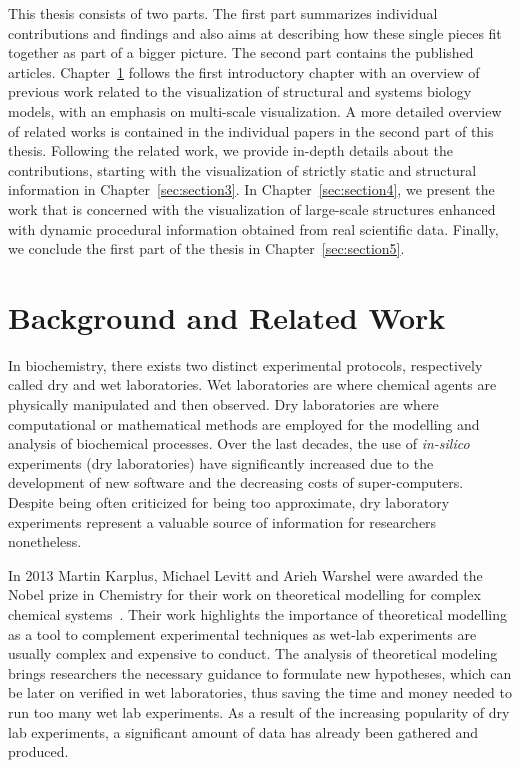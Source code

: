 This thesis consists of two parts.
The first part summarizes individual contributions and findings and also aims at describing how these single pieces fit together as part of a bigger picture.
The second part contains the published articles.
Chapter~\ref{sec:section2} follows the first introductory chapter with an overview of previous work related to the visualization of structural and systems biology models, with an emphasis on multi-scale visualization. 
A more detailed overview of related works is contained in the individual papers in the second part of this thesis. 
Following the related work, we provide in-depth details about the contributions, starting with the visualization of strictly static and structural information in Chapter~\ref{sec:section3}.
In Chapter~\ref{sec:section4}, we present the work that is concerned with the visualization of large-scale structures enhanced with dynamic procedural information obtained from real scientific data. 
Finally, we conclude the first part of the thesis in Chapter~\ref{sec:section5}.

\chapter{Background and Related Work}
\label{sec:section2}

In biochemistry, there exists two distinct experimental protocols, respectively called dry and wet laboratories.
Wet laboratories are where chemical agents are physically manipulated and then observed.
Dry laboratories are where computational or mathematical methods are employed for the modelling and analysis of biochemical processes. 
Over the last decades, the use of \textit{in-silico} experiments (dry laboratories) have significantly increased due to the development of new software and the decreasing costs of super-computers.
Despite being often criticized for being too approximate, dry laboratory experiments represent a valuable source of information for researchers nonetheless.

In 2013 Martin Karplus, Michael Levitt and Arieh Warshel were awarded the Nobel prize in Chemistry for their work on theoretical modelling for complex chemical systems~\cite{karplus2014development}.
Their work highlights the importance of theoretical modelling as a tool to complement experimental techniques as wet-lab experiments are usually complex and expensive to conduct.
The analysis of theoretical modeling brings researchers the necessary guidance to formulate new hypotheses, which can be later on verified in wet laboratories, thus saving the time and money needed to run too many wet lab experiments.
As a result of the increasing popularity of dry lab experiments, a significant amount of data has already been gathered and produced.

